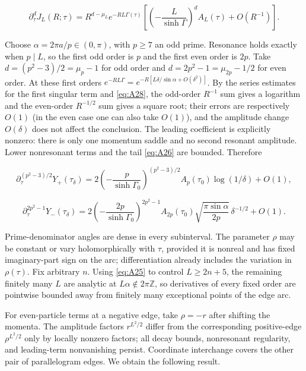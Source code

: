 \documentclass[11pt,a4paper]{article}
\numberwithin{equation}{section}
\theoremstyle{plain}
\theoremstyle{definition}
\begin{document}
\begin{equation}
\partial_\tau^d J_L(R;\tau)=R^{d-\mu_L}e^{-RL\Gamma(\tau)}\left[\left(-\frac{L}{\sinh\Gamma}\right)^dA_L(\tau)+O(R^{-1})\right].
\label{eq:A28}
\end{equation}

Choose \(\alpha=2\pi a/p\in(0,\pi)\), with \(p\ge7\) an odd prime. Resonance holds exactly when \(p\mid L\), so the first odd order is \(p\) and the first even order is \(2p\). Take \(d=(p^2-3)/2=\mu_p-1\) for odd order and \(d=2p^2-1=\mu_{2p}-1/2\) for even order. At these first orders \(e^{-RL\Gamma}=e^{-R[L\delta/\sin\alpha+O(\delta^2)]}\). By the series estimates for the first singular term and \eqref{eq:A28}, the odd-order \(R^{-1}\) sum gives a logarithm and the even-order \(R^{-1/2}\) sum gives a square root; their errors are respectively \(O(1)\) (in the even case one can also take \(O(1)\)), and the amplitude change \(O(\delta)\) does not affect the conclusion. The leading coefficient is explicitly nonzero: there is only one momentum saddle and no second resonant amplitude. Lower nonresonant terms and the tail \eqref{eq:A26} are bounded. Therefore

\begin{equation}
\partial_\tau^{(p^2-3)/2}Y_+(\tau_\delta)=2\left(-\frac p{\sinh\Gamma_0}\right)^{(p^2-3)/2}A_p(\tau_0)\log(1/\delta)+O(1),
\label{eq:A29}
\end{equation}

\begin{equation}
\partial_\tau^{2p^2-1}Y_-(\tau_\delta)=2\left(-\frac {2p}{\sinh\Gamma_0}\right)^{2p^2-1}A_{2p}(\tau_0)\sqrt{\frac{\pi\sin\alpha}{2p}}\,\delta^{-1/2}+O(1).
\label{eq:A30}
\end{equation}

Prime-denominator angles are dense in every subinterval. The parameter \(\rho\) may be constant or vary holomorphically with \(\tau\), provided it is nonreal and has fixed imaginary-part sign on the arc; differentiation already includes the variation in \(\rho(\tau)\). Fix arbitrary \(n\). Using \eqref{eq:A25} to control \(L\ge2n+5\), the remaining finitely many \(L\) are analytic at \(L\alpha\notin2\pi\mathbb Z\), so derivatives of every fixed order are pointwise bounded away from finitely many exceptional points of the edge arc.

For even-particle terms at a negative edge, take \(\rho=-r\) after shifting the momenta. The amplitude factors \(r^{L^2/2}\) differ from the corresponding positive-edge \(\rho^{L^2/2}\) only by locally nonzero factors; all decay bounds, nonresonant regularity, and leading-term nonvanishing persist. Coordinate interchange covers the other pair of parallelogram edges. We obtain the following result.
\end{document}
